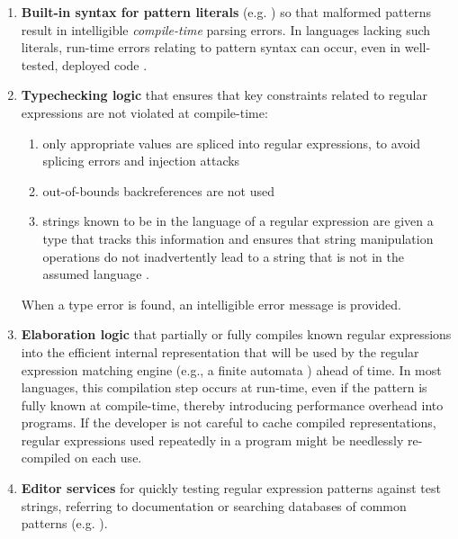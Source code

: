 \begin{enumerate}
\item \textbf{Built-in syntax for pattern literals} (e.g. \cite{perlre}) so that malformed patterns result in intelligible \emph{compile-time} parsing errors. In languages lacking such literals, run-time errors relating to pattern syntax can occur, even in well-tested, deployed code \cite{spishak2012type}. 
\item \textbf{Typechecking logic} that ensures that key constraints related to regular expressions are not violated at compile-time:
	\begin{enumerate}
	\item only appropriate values are spliced into regular expressions, to avoid splicing errors and injection attacks \cite{owasp2013}
	\item out-of-bounds backreferences are not used \cite{spishak2012type}
	\item strings known to be in the language of a regular expression are given a type that tracks this information and ensures that string manipulation operations do not inadvertently lead to a string that is not in the assumed language \cite{fulton-thesis}.
	\end{enumerate}
When a type error is found, an intelligible error message is provided.
\item \textbf{Elaboration logic} that partially or fully compiles known regular expressions into the efficient internal representation that will be used by the regular expression matching engine (e.g., a finite automata \cite{Thompson:1968:PTR:363347.363387}) ahead of time. In most languages, this compilation step occurs at run-time, even if the pattern is fully known at compile-time, thereby introducing performance overhead into programs. If the developer is not careful to cache compiled representations, regular expressions used repeatedly in a program might be needlessly re-compiled on each use. %
\item \textbf{Editor services} for quickly testing regular expression patterns against test strings,  referring to documentation or searching databases of common patterns (e.g. \cite{IntelliJRegexp}).
\end{enumerate}

